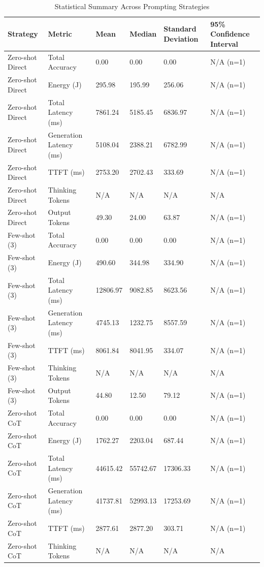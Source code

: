 \begin{table}
\caption{Statistical Summary Across Prompting Strategies}
\label{tab:statistical_summary}
\begin{tabular}{llllll}
\toprule
Strategy & Metric & Mean & Median & Standard Deviation & 95\% Confidence Interval \\
\midrule
Zero-shot Direct & Total Accuracy & 0.00 & 0.00 & 0.00 & N/A (n=1) \\
Zero-shot Direct & Energy (J) & 295.98 & 195.99 & 256.06 & N/A (n=1) \\
Zero-shot Direct & Total Latency (ms) & 7861.24 & 5185.45 & 6836.97 & N/A (n=1) \\
Zero-shot Direct & Generation Latency (ms) & 5108.04 & 2388.21 & 6782.99 & N/A (n=1) \\
Zero-shot Direct & TTFT (ms) & 2753.20 & 2702.43 & 333.69 & N/A (n=1) \\
Zero-shot Direct & Thinking Tokens & N/A & N/A & N/A & N/A \\
Zero-shot Direct & Output Tokens & 49.30 & 24.00 & 63.87 & N/A (n=1) \\
Few-shot (3) & Total Accuracy & 0.00 & 0.00 & 0.00 & N/A (n=1) \\
Few-shot (3) & Energy (J) & 490.60 & 344.98 & 334.90 & N/A (n=1) \\
Few-shot (3) & Total Latency (ms) & 12806.97 & 9082.85 & 8623.56 & N/A (n=1) \\
Few-shot (3) & Generation Latency (ms) & 4745.13 & 1232.75 & 8557.59 & N/A (n=1) \\
Few-shot (3) & TTFT (ms) & 8061.84 & 8041.95 & 334.07 & N/A (n=1) \\
Few-shot (3) & Thinking Tokens & N/A & N/A & N/A & N/A \\
Few-shot (3) & Output Tokens & 44.80 & 12.50 & 79.12 & N/A (n=1) \\
Zero-shot CoT & Total Accuracy & 0.00 & 0.00 & 0.00 & N/A (n=1) \\
Zero-shot CoT & Energy (J) & 1762.27 & 2203.04 & 687.44 & N/A (n=1) \\
Zero-shot CoT & Total Latency (ms) & 44615.42 & 55742.67 & 17306.33 & N/A (n=1) \\
Zero-shot CoT & Generation Latency (ms) & 41737.81 & 52993.13 & 17253.69 & N/A (n=1) \\
Zero-shot CoT & TTFT (ms) & 2877.61 & 2877.20 & 303.71 & N/A (n=1) \\
Zero-shot CoT & Thinking Tokens & N/A & N/A & N/A & N/A \\

\end{tabular}
\end{table}
